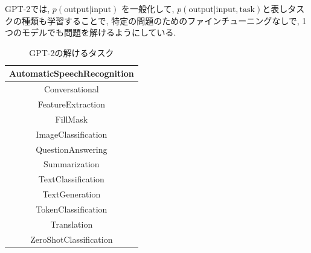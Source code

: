 \documentclass[twocolumn]{jarticle}     %
\begin{document}
GPT-2では, $p(\mathrm{output}|\mathrm{input})$ を一般化して,
$p(\mathrm{output}| \mathrm{input}, \mathrm{task})$と表しタスクの種類も学習することで, 特定の問題のためのファインチューニングなしで, 1つのモデルでも問題を解けるようにしている.


%
%
%
%


\begin{table}[tbh]
  \begin{center}
    \caption{GPT-2の解けるタスク}
    \begin{tabular}{|c|} \hline
      AutomaticSpeechRecognition \\ \hline
      Conversational \\ \hline
      FeatureExtraction \\ \hline
      FillMask \\ \hline
      ImageClassification \\ \hline
      QuestionAnswering \\ \hline
      Summarization \\ \hline
      TextClassification \\ \hline
      TextGeneration \\ \hline
      TokenClassification \\ \hline
      Translation \\ \hline
      ZeroShotClassification \\ \hline
    \end{tabular}
    \label{tab:task}
  \end{center}
\end{table}
\end{document}
